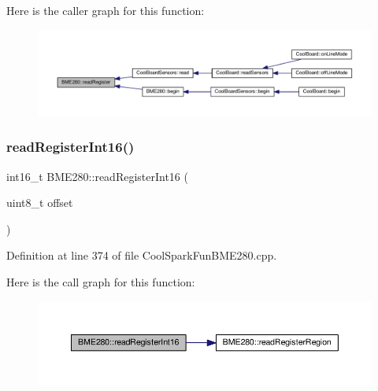 Here is the caller graph for this function\+:\nopagebreak
\begin{figure}[H]
\begin{center}
\leavevmode
\includegraphics[width=350pt]{class_b_m_e280_a1bbd14c8591966df531e40085342ff71_icgraph}
\end{center}
\end{figure}
\mbox{\label{class_b_m_e280_ac43c30f9b321d301694094d6b4bebe7e}} 
\subsubsection{\texorpdfstring{read\+Register\+Int16()}{readRegisterInt16()}}
{\footnotesize\ttfamily int16\+\_\+t B\+M\+E280\+::read\+Register\+Int16 (\begin{DoxyParamCaption}\item[{uint8\+\_\+t}]{offset }\end{DoxyParamCaption})}



Definition at line 374 of file Cool\+Spark\+Fun\+B\+M\+E280.\+cpp.

Here is the call graph for this function\+:\nopagebreak
\begin{figure}[H]
\begin{center}
\leavevmode
\includegraphics[width=350pt]{class_b_m_e280_ac43c30f9b321d301694094d6b4bebe7e_cgraph}
\end{center}
\end{figure}
\mbox{\label{class_b_m_e280_aecca87c2c40a7f2bcabcea921bdc6124}} 
